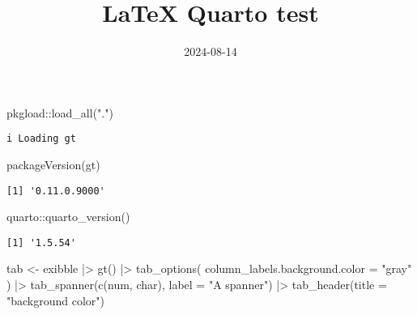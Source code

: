 \documentclass[
  letterpaper,
  DIV=11,
  numbers=noendperiod]{scrartcl}
\title{LaTeX Quarto test}
\author{}
\date{2024-08-14}
\newenvironment{Shaded}{\begin{snugshade}}{\end{snugshade}}
\newcommand{\AttributeTok}[1]{\textcolor[rgb]{0.40,0.45,0.13}{#1}}
\newcommand{\FunctionTok}[1]{\textcolor[rgb]{0.28,0.35,0.67}{#1}}
\newcommand{\NormalTok}[1]{\textcolor[rgb]{0.00,0.23,0.31}{#1}}
\newcommand{\OtherTok}[1]{\textcolor[rgb]{0.00,0.23,0.31}{#1}}
\newcommand{\SpecialCharTok}[1]{\textcolor[rgb]{0.37,0.37,0.37}{#1}}
\newcommand{\StringTok}[1]{\textcolor[rgb]{0.13,0.47,0.30}{#1}}
\begin{document}
\maketitle

\listoftables

\begin{Shaded}
\begin{Highlighting}[]
\NormalTok{pkgload}\SpecialCharTok{::}\FunctionTok{load\_all}\NormalTok{(}\StringTok{"."}\NormalTok{)}
\end{Highlighting}
\end{Shaded}

\begin{verbatim}
i Loading gt
\end{verbatim}

\begin{Shaded}
\begin{Highlighting}[]
\FunctionTok{packageVersion}\NormalTok{(}\StringTok{\textquotesingle{}gt\textquotesingle{}}\NormalTok{)}
\end{Highlighting}
\end{Shaded}

\begin{verbatim}
[1] '0.11.0.9000'
\end{verbatim}

\begin{Shaded}
\begin{Highlighting}[]
\NormalTok{quarto}\SpecialCharTok{::}\FunctionTok{quarto\_version}\NormalTok{()}
\end{Highlighting}
\end{Shaded}

\begin{verbatim}
[1] '1.5.54'
\end{verbatim}

\newpage{}

\begin{Shaded}
\begin{Highlighting}[]
\NormalTok{tab }\OtherTok{\textless{}{-}}\NormalTok{ exibble }\SpecialCharTok{|\textgreater{}}
  \FunctionTok{gt}\NormalTok{() }\SpecialCharTok{|\textgreater{}}
  \FunctionTok{tab\_options}\NormalTok{(}
    \AttributeTok{column\_labels.background.color =} \StringTok{"gray"}
\NormalTok{  ) }\SpecialCharTok{|\textgreater{}}
  \FunctionTok{tab\_spanner}\NormalTok{(}\FunctionTok{c}\NormalTok{(num, char), }\AttributeTok{label =} \StringTok{"A spanner"}\NormalTok{) }\SpecialCharTok{|\textgreater{}}
  \FunctionTok{tab\_header}\NormalTok{(}\AttributeTok{title =} \StringTok{"background color"}\NormalTok{)}
\end{Highlighting}
\end{Shaded}
\end{document}
